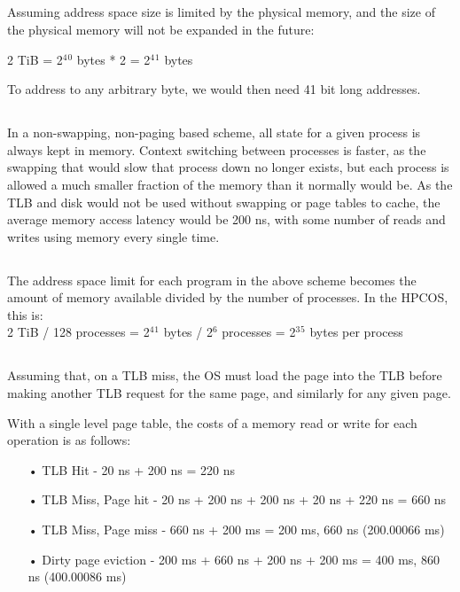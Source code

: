 \documentclass{article}
\begin{document}
\subsection{}
Assuming address space size is limited by the physical memory, and the size of the physical memory will not be expanded in the future:

2 TiB = 2$^4$$^0$ bytes * 2 = 2$^4$$^1$ bytes

To address to any arbitrary byte, we would then need 41 bit long addresses.

\subsection{}
In a non-swapping, non-paging based scheme, all state for a given process is always kept in memory. Context switching between processes is faster, as the swapping that would slow that process down no longer exists, but each process is allowed a much smaller fraction of the memory than it normally would be.
As the TLB and disk would not be used without swapping or page tables to cache, the average memory access latency would be 200 ns, with some number of reads and writes using memory every single time.

\subsection{}
The address space limit for each program in the above scheme becomes the amount of memory available divided by the number of processes. In the HPCOS, this is:\\
2 TiB / 128 processes = 2$^4$$^1$ bytes / 2$^6$ processes = 2$^3$$^5$ bytes per process

\subsection{}
Assuming that, on a TLB miss, the OS must load the page into the TLB before making another TLB request for the same page, and similarly for any given page.

With a single level page table, the costs of a memory read or write for each operation is as follows:
\begin{itemize}
\item[•] TLB Hit - 20 ns + 200 ns = 220 ns
\item[•] TLB Miss, Page hit - 20 ns + 200 ns + 200 ns + 20 ns + 220 ns = 660 ns
\item[•] TLB Miss, Page miss - 660 ns + 200 ms = 200 ms, 660 ns (200.00066 ms)
\item[•] Dirty page eviction - 200 ms + 660 ns + 200 ns + 200 ms = 400 ms, 860 ns (400.00086 ms)
\end{itemize}
\end{document}
